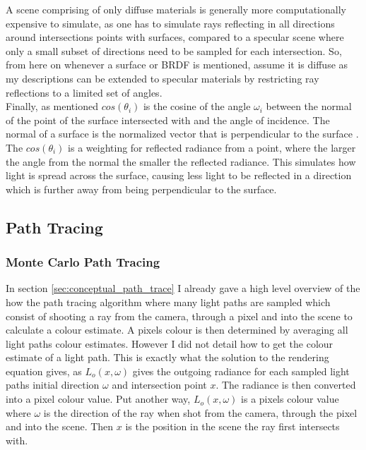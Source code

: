 \documentclass[../dissertation.tex]{subfiles}
\begin{document}
A scene comprising of only diffuse materials is generally more computationally expensive to simulate, as one has to simulate rays reflecting in all directions around intersections points with surfaces, compared to a specular scene where only a small subset of directions need to be sampled for each intersection. So, from here on whenever a surface or BRDF is mentioned, assume it is diffuse as my descriptions can be extended to specular materials by restricting ray reflections to a limited set of angles.\\

Finally, as mentioned $cos(\theta_i)$ is the cosine of the angle $\omega_i$ between the normal of the point of the surface intersected with and the angle of incidence. The normal of a surface is the normalized vector that is perpendicular to the surface \cite{normals}. The $cos(\theta_i)$ is a weighting for reflected radiance from a point, where the larger the angle from the normal the smaller the reflected radiance. This simulates how light is spread across the surface, causing less light to be reflected in a direction which is further away from being perpendicular to the surface.

\subsection{Path Tracing}

\subsubsection{Monte Carlo Path Tracing}

In section \ref{sec:conceptual_path_trace} I already gave a high level overview of the how the path tracing algorithm where many light paths are sampled which consist of shooting a ray from the camera, through a pixel and into the scene to calculate a colour estimate. A pixels colour is then determined by averaging all light paths colour estimates. However I did not detail how to get the colour estimate of a light path. This is exactly what the solution to the rendering equation gives, as $L_o(x,\omega)$ gives the outgoing radiance for each sampled light paths initial direction $\omega$ and intersection point $x$. The radiance is then converted into a pixel colour value. Put another way, $L_o(x,\omega)$ is a pixels colour value where $\omega$ is the direction of the ray when shot from the camera, through the pixel and into the scene. Then $x$ is the position in the scene the ray first intersects with. \\
\end{document}
